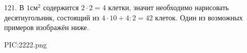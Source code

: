 121. В $1\text{см}^2$ содержится $2\cdot2=4$ клетки, значит необходимо нарисовать десятиугольник, состоящий из $4\cdot10+4:2=42$ клеток. Один из возможных примеров изображён ниже.
\begin{center}
{{PIC:2222.png}}
\end{center}
